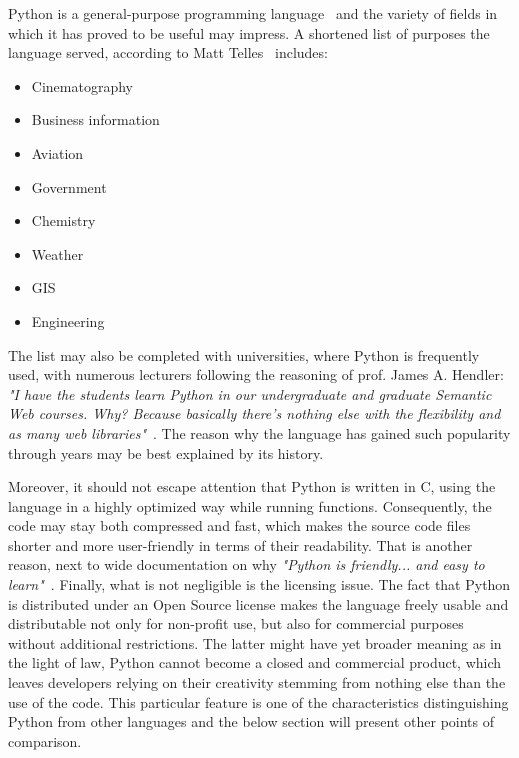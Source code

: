 Python is a general-purpose programming language~\cite[page 3]{py_nutshell} and the variety of fields in which it has proved to be useful may impress. A shortened list of purposes the language served, according to Matt Telles~\cite[page 13]{py_power} includes:
\begin{itemize}
\item{Cinematography}
\item{Business information}
\item{Aviation}
\item{Government}
\item{Chemistry}
\item{Weather}
\item{GIS}
\item{Engineering}
\end{itemize}
The list may also be completed with universities, where Python is frequently used, with numerous lecturers following the reasoning of prof. James A. Hendler: \textit{"I have the students learn Python in our undergraduate and graduate Semantic Web courses. Why? Because basically there's nothing else with the flexibility and as many web libraries"}~\cite{py_quote}. The reason why the language has gained such popularity through years may be best explained by its history.

Moreover, it should not escape attention that Python is written in C, using the language in a highly optimized way while running functions. Consequently, the code may stay both compressed and fast, which makes the source code files shorter and more user-friendly in terms of their readability. That is another reason, next to wide documentation on why \textit{"Python is friendly... and easy to learn"}~\cite{py_about}. Finally, what is not negligible is the licensing issue. The fact that Python is distributed under an Open Source license makes the language freely usable and distributable not only for non-profit use, but also for commercial purposes without additional restrictions. The latter might have yet broader meaning as in the light of law, Python cannot become a closed and commercial product, which leaves developers relying on their creativity stemming from nothing else than the use of the code. This particular feature is one of the characteristics distinguishing Python from other languages and the below section will present other points of comparison.

